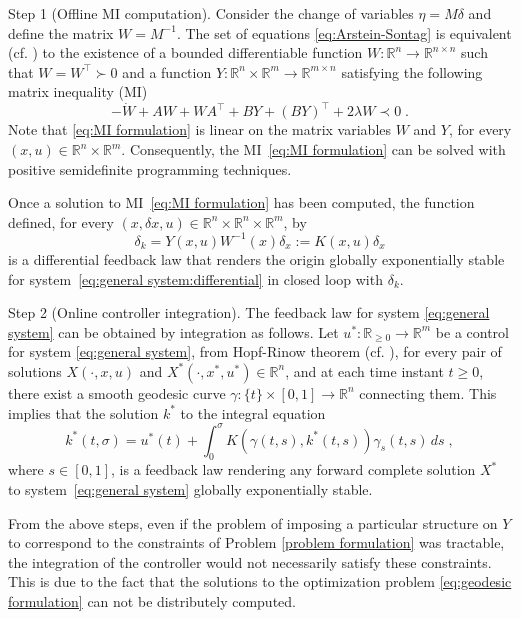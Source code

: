 \documentclass[10pt,twocolumn,twoside]{IEEEtran}
\theoremstyle{plain}
\theoremstyle{definition}
\theoremstyle{remark}
\begin{document}
Step 1 (Offline MI computation). Consider the change of variables $\eta=M\delta$ and define the matrix $W=M^{-1}$. The set of equations \eqref{eq:Arstein-Sontag} is equivalent (cf. \cite[Lemma 11.1]{CalafioreGhaoui2014}) to the existence of a bounded differentiable function $W:\mathbb{R}^n\to\mathbb{R}^{n\times n}$ such that $W=W^\top\succ0$ and a function $Y:\mathbb{R}^n\times\mathbb{R}^m\to\mathbb{R}^{m\times n}$ satisfying the following matrix inequality (MI)
\begin{equation}\label{eq:MI formulation}
	-\dot{W}+AW+WA^\top+BY+(BY)^\top+2\lambda W\prec0\;.
\end{equation}
Note that \eqref{eq:MI formulation} is linear on the matrix variables $W$ and $Y$, for every $(x,u)\in\mathbb{R}^n\times\mathbb{R}^m$. Consequently, the MI~\eqref{eq:MI formulation} can be solved with positive semidefinite programming techniques.

Once a solution to MI~\eqref{eq:MI formulation} has been computed, the function defined, for every $(x,\delta x,u)\in\mathbb{R}^n\times\mathbb{R}^n\times\mathbb{R}^m$, by
	\begin{equation}\label{eq:differential feedback law}
		\delta_k=Y(x,u)W^{-1}(x)\delta_x:=K(x,u)\delta_x
	\end{equation}
	is a differential feedback law that renders the origin globally exponentially stable for system~\eqref{eq:general system:differential} in closed loop with $\delta_k$.

Step 2 (Online controller integration). The feedback law for system \eqref{eq:general system} can be obtained by integration as follows. Let $u^\ast:\mathbb{R}_{\geq0}\to\mathbb{R}^m$ be a control for system \eqref{eq:general system}, from Hopf-Rinow theorem (cf. \cite[Theorem 7.7]{Boothby1986}), for every pair of solutions $X(\cdot,x,u)$ and $X^\ast(\cdot,x^\ast,u^\ast)\in\mathbb{R}^n$, and at each time instant $t\geq0$,  there exist a smooth geodesic curve $\gamma:\{t\}\times [0,1]\to\mathbb{R}^n$ connecting them. This implies that the solution $k^\ast$ to the integral equation
\begin{equation}\label{eq:contracting feedback law}
	k^\ast(t,\sigma)=u^\ast(t)+\int_0^\sigma K(\gamma(t,s),k^\ast(t,s))\gamma_s(t,s)\,ds\;,
\end{equation}
where $s\in[0,1]$, is a feedback law rendering any forward complete solution $X^\ast$ to system~\eqref{eq:general system} globally exponentially stable.

From the above steps, even if the problem of imposing a particular structure on $Y$ to correspond to the constraints of Problem \ref{problem formulation} was tractable, the integration of the controller would not necessarily satisfy these constraints. This is due to the fact that the solutions to the optimization problem \eqref{eq:geodesic formulation} can not be distributely computed.
\end{document}
